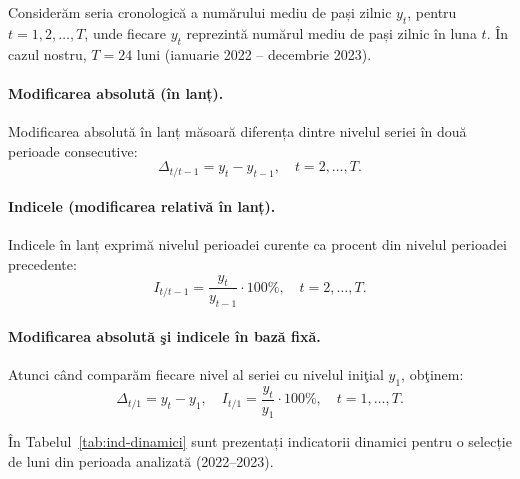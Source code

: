 \documentclass[12pt,a4paper]{report}
\begin{document}
Considerăm seria cronologică a numărului mediu de pași zilnic \(y_t\), pentru \(t = 1, 2, \dots, T\), unde fiecare \(y_t\) reprezintă numărul mediu de pași zilnic în luna \(t\). În cazul nostru, \(T = 24\) luni (ianuarie 2022 -- decembrie 2023).

\paragraph{Modificarea absolută (în lanț).}
Modificarea absolută în lanț măsoară diferența dintre nivelul seriei în două perioade consecutive:
\[
\Delta_{t/t-1} = y_t - y_{t-1}, \quad t = 2, \dots, T.
\]

\paragraph{Indicele (modificarea relativă în lanț).}
Indicele în lanț exprimă nivelul perioadei curente ca procent din nivelul perioadei precedente:
\[
I_{t/t-1} = \frac{y_t}{y_{t-1}} \cdot 100\%, \quad t = 2, \dots, T.
\]

\paragraph{Modificarea absolută şi indicele în bază fixă.}
Atunci când comparăm fiecare nivel al seriei cu nivelul iniţial \(y_1\), obţinem:
\[
\Delta_{t/1} = y_t - y_1, \quad
I_{t/1} = \frac{y_t}{y_1} \cdot 100\%, \quad t = 1, \dots, T.
\]

În Tabelul~\ref{tab:ind-dinamici} sunt prezentați indicatorii dinamici pentru o selecție de luni din perioada analizată (2022--2023).
\end{document}
